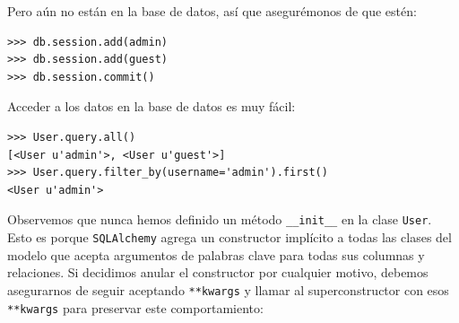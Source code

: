\documentclass[10pt,letterpaper,notumble]{leaflet}
\begin{document}
    Pero aún no están en la base de datos, así que asegurémonos de que estén:
    {\footnotesize
    \begin{verbatim}
>>> db.session.add(admin)
>>> db.session.add(guest)
>>> db.session.commit()
    \end{verbatim}}
    
    \vspace*{-0.3cm}
    
    Acceder a los datos en la base de datos es muy fácil:
    
    \vspace*{-0.3cm}
    
    {\footnotesize
    \begin{verbatim}
>>> User.query.all()
[<User u'admin'>, <User u'guest'>]
>>> User.query.filter_by(username='admin').first()
<User u'admin'>
    \end{verbatim}}

    \vspace*{-0.3cm}
    
    Observemos que nunca hemos definido un método \texttt{\_\_init\_\_} en la clase \texttt{User}. Esto es porque \texttt{SQLAlchemy} agrega un constructor implícito a todas las clases del modelo que acepta argumentos de palabras clave para todas sus columnas y relaciones. Si decidimos anular el constructor por cualquier motivo, debemos asegurarnos de seguir aceptando \texttt{**kwargs} y llamar al superconstructor con esos \texttt{**kwargs} para preservar este comportamiento:
    
    \vspace{5cm}
    
    
    
\end{document}
